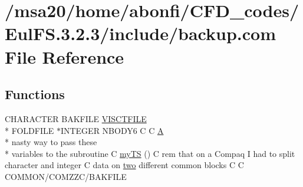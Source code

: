 \hypertarget{msa20_2home_2abonfi_2_c_f_d__codes_2_eul_f_s_83_82_83_2include_2backup_8com}{\section{/msa20/home/abonfi/\-C\-F\-D\-\_\-codes/\-Eul\-F\-S.3.2.3/include/backup.com File Reference}
\label{msa20_2home_2abonfi_2_c_f_d__codes_2_eul_f_s_83_82_83_2include_2backup_8com}
}
\subsection*{Functions}
\begin{DoxyCompactItemize}
\item 
C\-H\-A\-R\-A\-C\-T\-E\-R B\-A\-K\-F\-I\-L\-E \hyperlink{msa20_2home_2abonfi_2_c_f_d__codes_2_eul_f_s_83_82_83_2include_2backup_8com_a95c1296e8e0de833d5ad9c330b97f734}{V\-I\-S\-C\-T\-F\-I\-L\-E} \\*
F\-O\-L\-D\-F\-I\-L\-E $\ast$I\-N\-T\-E\-G\-E\-R N\-B\-O\-D\-Y6 C C \hyperlink{msa20_2home_2abonfi_2_c_f_d__codes_2_eul_f_s_83_82_83_2include_2ibc2_8com_ad2108d58343608772fff791c23da58f5}{A} \\*
nasty way to pass these \\*
variables to the subroutine C \hyperlink{msa20_2home_2abonfi_2_c_f_d__codes_2_eul_f_s_83_82_83_2include_2backup_8com_a11cd648710b4262037820f234b3c55d7}{my\-T\-S} () C rem that on a Compaq I had to split character and integer C data on \hyperlink{msa20_2home_2abonfi_2_c_f_d__codes_2_eul_f_s_83_82_83_2include_2time_8com_af6fa394ac00f173f45ace38681d2e1a4}{two} different common blocks C C C\-O\-M\-M\-O\-N/C\-O\-M\-Z\-Z\-C/B\-A\-K\-F\-I\-L\-E
\end{DoxyCompactItemize}

